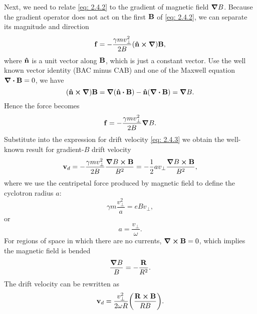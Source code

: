 \documentclass[10pt]{article}
\begin{document}
Next, we need to relate \eqref{eq: 2.4.2} to the gradient of magnetic field $\grad{B}$. Because the gradient operator does not act on the first $\vb{B}$ of \eqref{eq: 2.4.2}, we can separate its magnitude and direction
\begin{equation}
	\vb{f} = -\frac{\gamma m v_{\perp}^2}{2B} (\vu{n} \cross \grad) \vb{B},
\end{equation}
where $\vu{n}$ is a unit vector along $\vb{B}$, which is just a constant vector. Use the well known vector identity (BAC minus CAB) and one of the Maxwell equation $\div{\vb{B}} = 0$, we have
\begin{equation}
	(\vu{n} \cross \grad) \vb{B} = \grad{(\vu{n} \vdot \vb{B})} - \vu{n} (\div{\vb{B}}) = \grad{B}.
\end{equation}
Hence the force becomes
\begin{equation}
	\vb{f} = -\frac{\gamma m v_{\perp}^2}{2B} \grad{B}.
\end{equation}
Substitute into the expression for drift velocity \eqref{eq: 2.4.3} we obtain the well-known result for gradient-$B$ drift velocity
\begin{equation}
	\vb{v}_d = -\frac{\gamma m v_{\perp}^2}{2B} \frac{\grad{B} \cross \vb{B}}{B^2} = - \frac{1}{2}a v_{\perp} \frac{\grad{B} \cross \vb{B}}{B^2},
\end{equation}
where we use the centripetal force produced by magnetic field to define the cyclotron radius $a$:
\begin{equation}
	\gamma m \frac{v_{\perp}^2}{a} = eB v_{\perp},
\end{equation}
or
\begin{equation}
	a = \frac{v_{\perp}}{\omega}.
\end{equation}
For regions of space in which there are no currents, $\curl{\vb{B}} = 0$, which implies the magnetic field is bended
\begin{equation}
	\frac{\grad{B}}{B} = -\frac{\vb{R}}{R^2}.
\end{equation}
The drift velocity can be rewritten as
\begin{equation}
	\vb{v}_d = \frac{v_{\perp}^2}{2\omega R} \qty(\frac{\vb{R} \cross \vb{B}}{RB}).
\end{equation}
\end{document}
